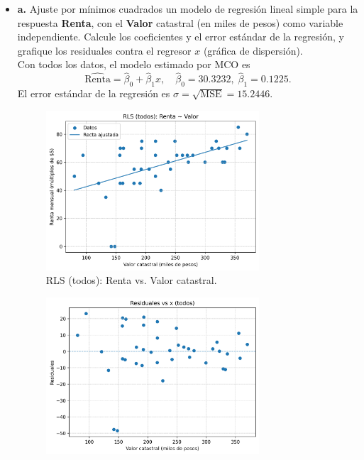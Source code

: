 \documentclass[10pt]{article}
\begin{document}
\begin{itemize}
    \item \textbf{a.} Ajuste por mínimos cuadrados un modelo de regresión lineal simple para la respuesta \textbf{Renta}, con el \textbf{Valor} catastral (en miles de pesos) como variable independiente. Calcule los coeficientes y el error estándar de la regresión, y grafique los residuales contra el regresor $x$ (gráfica de dispersión).\\
    \begingroup\color{blue}
    Con todos los datos, el modelo estimado por MCO es
    \[
      \widehat{\text{Renta}} = \hat\beta_0 + \hat\beta_1 x,\quad \hat\beta_0=30.3232,\; \hat\beta_1=0.1225.
    \]
    El error estándar de la regresión es \(\sigma = \sqrt{\mathrm{MSE}} = 15.2446\).

    \begin{figure}[H]
      \centering
      \includegraphics[width=0.75\textwidth]{../plots/python/ejercicio4/full_scatter_line.png}
      \caption{RLS (todos): Renta vs. Valor catastral.}
      \label{fig:cable_full_line}
    \end{figure}
    \begin{figure}[H]
      \centering
      \includegraphics[width=0.75\textwidth]{../plots/python/ejercicio4/full_resid_vs_x.png}

\end{figure}
\end{itemize}
\end{document}

